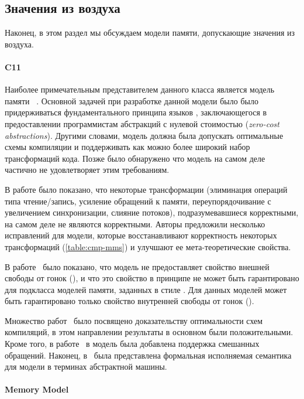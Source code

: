 \subsection{Значения из воздуха}

Наконец, в этом раздел мы обсуждаем модели памяти, 
допускающие значения из воздуха. 

\paragraph{C11}

Наиболее примечательным представителем данного класса 
является модель памяти \CMM~\cite{Batty-al:POPL11}.
Основной задачей при разработке данной модели было 
было придерживаться фундаментального принципа языков \CPP, 
заключающегося в предоставлении программистам 
абстракций с нулевой стоимостью (\emph{zero-cost abstractions}).
Другими словами, модель \CMM должна была допускать
оптимальные схемы компиляции и поддерживать
как можно более широкий набор трансформаций кода. 
Позже было обнаружено что модель на самом деле 
частично не удовлетворяет этим требованиям. 


В работе \cite{Vafeiadis-al:POPL15} было показано, что некоторые трансформации 
(элиминация операций типа чтение/запись, усиление обращений к памяти,
переупорядочивание с увеличением синхронизации, слияние потоков), 
подразумевавшиеся корректными, на самом деле не являются корректными.
Авторы предложили несколько исправлений для модели, 
которые восстанавливают корректность некоторых трансформаций (\see \cref{table:cmp-mms})
и улучшают ее мета-теоретические свойства. 

В работе~\cite{Batty-al:ESOP15} было показано, 
что модель не предоставляет свойство внешней свободы от гонок (\eDRF), 
и что это свойство в принципе не может быть гарантировано 
для подкласса моделей памяти, заданных в стиле \CMM.
Для данных моделей может быть гарантировано 
только свойство внутренней свободы от гонок (\iDRF).

Множество работ~\cite{Batty-al:POPL11, Sarkar-al:PLDI12, Batty-al:POPL12, Batty-al:POPL16} 
было посвящено доказательству оптимальности схем компиляций, 
в этом направлении результаты в основном были положительными. 
Кроме того, в работе~\cite{Flur-al:POPL17} в модель была 
добавлена поддержка смешанных обращений. 
Наконец, в~\cite{Nienhuis-al:OOPSLA16} была представлена 
формальная исполняемая семантика для модели \CMM в терминах абстрактной машины.  

\paragraph{\JS Memory Model}

